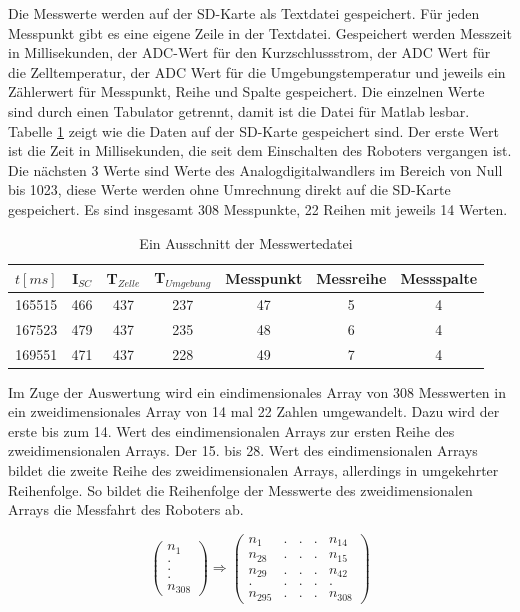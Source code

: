 \documentclass[a4paper,bibtotoc,oneside]{scrbook}
\begin{document}
Die Messwerte werden auf der SD-Karte als Textdatei gespeichert. Für jeden Messpunkt gibt es eine eigene Zeile in der Textdatei. Gespeichert werden Messzeit in Millisekunden, der ADC-Wert für den Kurzschlussstrom, der ADC Wert für die Zelltemperatur, der ADC Wert für die Umgebungstemperatur und jeweils ein Zählerwert für Messpunkt, Reihe und Spalte gespeichert. Die einzelnen Werte sind durch einen Tabulator getrennt, damit ist die Datei für Matlab lesbar.  
Tabelle \ref{TabSD} zeigt wie die Daten auf der SD-Karte gespeichert sind. Der erste Wert ist die Zeit in Millisekunden, die seit dem Einschalten des Roboters vergangen ist. Die nächsten 3 Werte sind Werte des Analogdigitalwandlers im Bereich von Null bis 1023, diese Werte werden ohne Umrechnung direkt auf die SD-Karte gespeichert. Es sind insgesamt 308 Messpunkte, 22 Reihen mit jeweils 14 Werten.  

 
\begin{table}[htbp]
\centering
\begin{tabular}{ | c | c | c | c | c | c | c | } 
\hline
$t [ms]$ & I$_{SC}$ & T$_{Zelle}$ & T$_{Umgebung}$ & Messpunkt & Messreihe & Messspalte \\
\hline
\hline
{165515} & {466} & {437} & {237} & {47} & {5} & {4} \\
\hline
{167523} & {479} & {437} & {235} & {48} & {6} & {4} \\
\hline
{169551} & {471} & {437} & {228} & {49} & {7} & {4} \\
\hline
\end{tabular}
\caption{Ein Ausschnitt der Messwertedatei}\label{TabSD}
\end{table}

\noindent Im Zuge der Auswertung wird ein eindimensionales Array von 308 Messwerten in ein zweidimensionales Array von 14 mal 22 Zahlen umgewandelt. Dazu wird der erste bis zum 14. Wert des eindimensionalen Arrays zur ersten Reihe des zweidimensionalen Arrays. Der 15. bis 28. Wert des eindimensionalen Arrays bildet die zweite Reihe des zweidimensionalen Arrays, allerdings in umgekehrter Reihenfolge. So bildet die Reihenfolge der Messwerte des zweidimensionalen Arrays die Messfahrt des Roboters ab.
\newline

\begin{equation}
\begin{pmatrix}
n_1 \\ . \\ . \\ . \\ n_{308} 
\end{pmatrix}
\Longrightarrow
\begin{pmatrix}
n_{1}  & . &.& .& n_{14} \\
n_{28} & .& .& . &n_{15}  \\
n_{29}  &. &.& .& n_{42}  \\
. &.& .& . & . \\
n_{295}  &.& .&.& n_{308} 
\end{pmatrix}
\end{equation}
\end{document}
